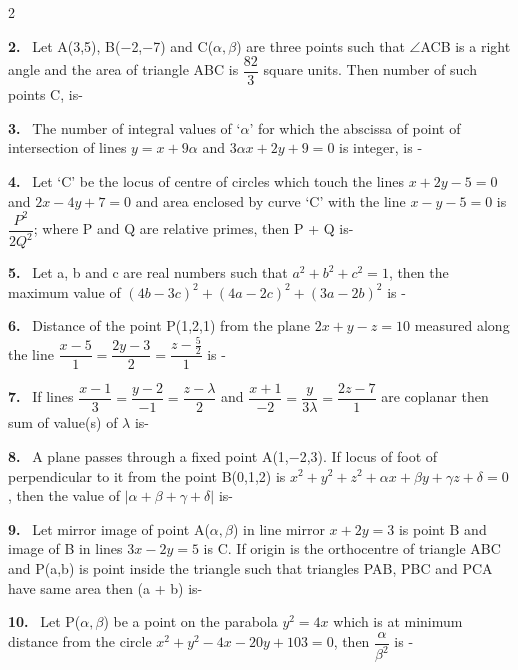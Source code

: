 \documentclass[10pt]{extarticle}
\newcommand{\qn}[1]{\par\smallskip\noindent\textbf{#1.}~}
\begin{document}
\begin{multicols}{2}
\qn{2} Let A(3,5), B($-$2,$-$7) and C($\alpha,\beta$) are three points such that $\angle$ACB is a right angle and the area of triangle ABC is $\dfrac{82}{3}$ square units. Then number of such points C, is-
\qn{3} The number of integral values of `$\alpha$' for which the abscissa of point of intersection of lines $y=x+9\alpha$ and $3\alpha x+2y+9=0$ is integer, is -
\qn{4} Let `C' be the locus of centre of circles which touch the lines $x+2y-5=0$ and $2x-4y+7=0$ and area enclosed by curve `C' with the line $x-y-5=0$ is $\dfrac{P^2}{2Q^2}$; where P and Q are relative primes, then P + Q is-
\qn{5} Let a, b and c are real numbers such that $a^2+b^2+c^2=1$, then the maximum value of $(4b-3c)^2+(4a-2c)^2+(3a-2b)^2$ is -
\qn{6} Distance of the point P(1,2,1) from the plane $2x+y-z=10$ measured along the line $\dfrac{x-5}{1}=\dfrac{2y-3}{2}=\dfrac{z-\frac{5}{2}}{1}$ is -
\qn{7} If lines $\dfrac{x-1}{3}=\dfrac{y-2}{-1}=\dfrac{z-\lambda}{2}$ and $\dfrac{x+1}{-2}=\dfrac{y}{3\lambda}=\dfrac{2z-7}{1}$ are coplanar then sum of value(s) of $\lambda$ is-
\qn{8} A plane passes through a fixed point A(1,$-$2,3). If locus of foot of perpendicular to it from the point B(0,1,2) is $x^2+y^2+z^2+\alpha x+\beta y+\gamma z+\delta=0$, then the value of $|\alpha+\beta+\gamma+\delta|$ is-
\qn{9} Let mirror image of point A($\alpha,\beta$) in line mirror $x+2y=3$ is point B and image of B in lines $3x-2y=5$ is C. If origin is the orthocentre of triangle ABC and P(a,b) is point inside the triangle such that triangles PAB, PBC and PCA have same area then (a + b) is-
\qn{10} Let P($\alpha,\beta$) be a point on the parabola $y^2=4x$ which is at minimum distance from the circle $x^2+y^2-4x-20y+103=0$, then $\dfrac{\alpha}{\beta^2}$ is -
\end{multicols}
\end{document}
